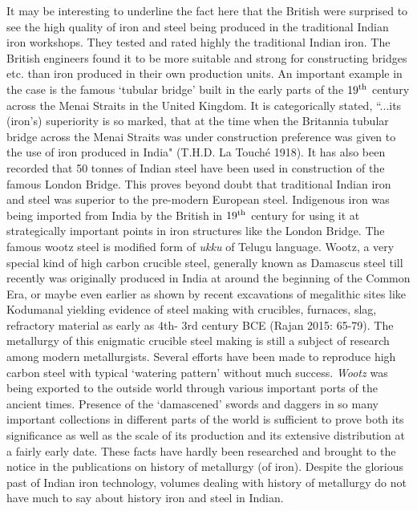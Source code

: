 It may be interesting to underline the fact here that the British were surprised to see the high quality of iron and steel being produced in the traditional Indian iron workshops. They tested and rated highly the traditional Indian iron. The British engineers found it to be more suitable and strong for constructing bridges etc. than iron produced in their own production units. An important example in the case is the famous `tubular bridge' built in the early parts of the $19^{\rm th}$ century across the Menai Straits in the United Kingdom. It is categorically stated, ``...its (iron's) superiority is so marked, that at the time when the Britannia tubular bridge across the Menai Straits was under construction preference was given to the use of iron produced in India" (T.H.D. La Touché 1918). It has also been recorded that 50 tonnes of Indian steel have been used in construction of the famous London Bridge. This proves beyond doubt that traditional Indian iron and steel was superior to the pre-modern European steel. Indigenous iron was being imported from India by the British in $19^{\rm th}$ century for using it at strategically important points in iron structures like the London Bridge. The famous wootz steel is modified form of \textit{ukku} of Telugu language. Wootz, a very special kind of high carbon crucible steel, generally known as Damascus steel till recently was originally produced in India at around the beginning of the Common Era, or maybe even earlier as shown by recent excavations of megalithic sites like Kodumanal yielding evidence of steel making with crucibles, furnaces, slag, refractory material as early as 4th- 3rd century BCE (Rajan 2015: 65-79). The metallurgy of this enigmatic crucible steel making is still a subject of research among modern metallurgists. Several efforts have been made to reproduce high carbon steel with typical `watering pattern' without much success. \textit{Wootz} was being exported to the outside world through various important ports of the ancient times. Presence of the `damascened' swords and daggers in so many important collections in different parts of the world is sufficient to prove both its significance as well as the scale of its production and its extensive distribution at a fairly early date. These facts have hardly been researched and brought to the notice in the publications on history of metallurgy (of iron). Despite the glorious past of Indian iron technology, volumes dealing with history of metallurgy do not have much to say about history iron and steel in Indian.


